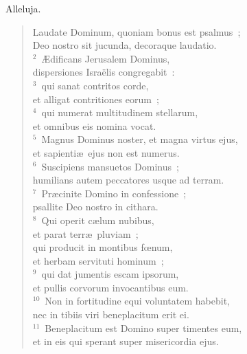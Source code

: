 \lettrine[lines=3,image=true,loversize=0.05,lraise=-0.03]{A}{}lleluja. \begin{flushleft}\begin{verse}\vspace{6pt}Laudate Dominum, quoniam bonus est psalmus~;\\ Deo nostro sit jucunda, decoraque laudatio.\\
${}^{2}$~\AE dificans Jerusalem Dominus,\\ dispersiones Isra\"elis congregabit~:\\
${}^{3}$~qui sanat contritos corde,\\ et alligat contritiones eorum~;\\
${}^{4}$~qui numerat multitudinem stellarum,\\ et omnibus eis nomina vocat.\\
${}^{5}$~Magnus Dominus noster, et magna virtus ejus,\\ et sapienti\ae\ ejus non est numerus.\\
${}^{6}$~Suscipiens mansuetos Dominus~;\\ humilians autem peccatores usque ad terram.\\
${}^{7}$~Pr\ae cinite Domino in confessione~;\\ psallite Deo nostro in cithara.\\
${}^{8}$~Qui operit c\ae lum nubibus,\\ et parat terr\ae\ pluviam~;\\ qui producit in montibus fœnum,\\ et herbam servituti hominum~;\\
${}^{9}$~qui dat jumentis escam ipsorum,\\ et pullis corvorum invocantibus eum.\\
${}^{10}$~Non in fortitudine equi voluntatem habebit,\\ nec in tibiis viri beneplacitum erit ei.\\
${}^{11}$~Beneplacitum est Domino super timentes eum,\\ et in eis qui sperant super misericordia ejus.\end{verse}\end{flushleft}



